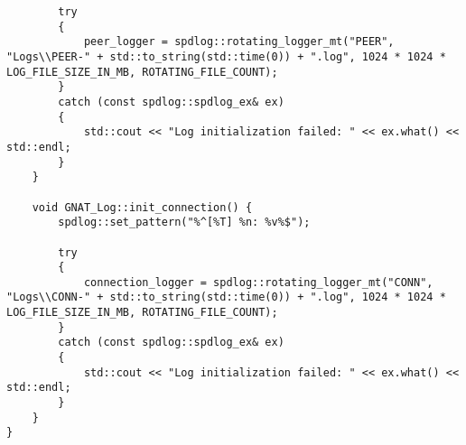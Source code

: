 \begin{lstlisting}
		try
		{
			peer_logger = spdlog::rotating_logger_mt("PEER", "Logs\\PEER-" + std::to_string(std::time(0)) + ".log", 1024 * 1024 * LOG_FILE_SIZE_IN_MB, ROTATING_FILE_COUNT);
		}
		catch (const spdlog::spdlog_ex& ex)
		{
			std::cout << "Log initialization failed: " << ex.what() << std::endl;
		}
	}

	void GNAT_Log::init_connection() {
		spdlog::set_pattern("%^[%T] %n: %v%$");

		try
		{
			connection_logger = spdlog::rotating_logger_mt("CONN", "Logs\\CONN-" + std::to_string(std::time(0)) + ".log", 1024 * 1024 * LOG_FILE_SIZE_IN_MB, ROTATING_FILE_COUNT);
		}
		catch (const spdlog::spdlog_ex& ex)
		{
			std::cout << "Log initialization failed: " << ex.what() << std::endl;
		}
	}
}
\end{lstlisting}
